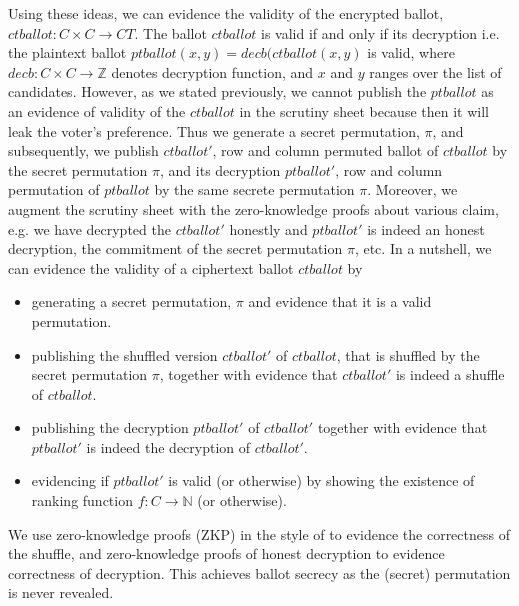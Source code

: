 Using these 
ideas, we can evidence the validity of the encrypted ballot,  $ctballot : C \times C \to CT$. 
The ballot $ctballot$ is valid if and only if its decryption  i.e. the plaintext ballot 
$ptballot (x, y) = decb(ctballot (x, y)$ is valid, where $decb : C \times C \to \mathbb{Z}$ 
denotes decryption function, and $x$ and $y$ ranges over the list of candidates. 
However,  as we stated previously, we cannot publish the $ptballot$ as an evidence of validity of 
the $ctballot$ in the scrutiny sheet because then it will leak the 
voter's preference. Thus we generate a secret permutation, $\pi$,  and  subsequently, 
we publish $ctballot'$,  row and column permuted ballot 
of $ctballot$ by the secret permutation $\pi$,  and its decryption $ptballot'$, 
row and column permutation of $ptballot$ by the same secrete permutation $\pi$. 
Moreover,  we augment the scrutiny sheet with the zero-knowledge proofs about various claim, 
e.g. we have decrypted the $ctballot'$ honestly and $ptballot'$ is indeed an honest 
decryption,  the commitment of the secret permutation $\pi$,  etc.  
In a nutshell, we can evidence the validity
of a ciphertext ballot $ctballot$ by
\begin{itemize}
  \item generating a secret permutation, $\pi$ and evidence that it is a valid permutation.
  \item publishing the shuffled version $ctballot'$ of $ctballot$, that is
  shuffled by the secret permutation $\pi$, together with
  evidence that $ctballot'$ is indeed a shuffle of $ctballot$.
  \item publishing the decryption $ptballot'$ of $ctballot'$ together with
  evidence that $ptballot'$ is indeed the decryption of $ctballot'$.
  \item evidencing if $ptballot'$ is valid (or otherwise) by showing the 
  existence of ranking function $f : C \to \mathbb{N}$ (or otherwise).
\end{itemize}

\noindent
We use zero-knowledge proofs (ZKP) in the style of \citep{DBLP:conf/africacrypt/TereliusW10}
to evidence the correctness of the shuffle, and zero-knowledge
proofs of honest decryption \citep{DBLP:conf/crypto/ChaumP92} to evidence
correctness of decryption. This achieves ballot secrecy as
the (secret) permutation is never revealed.


